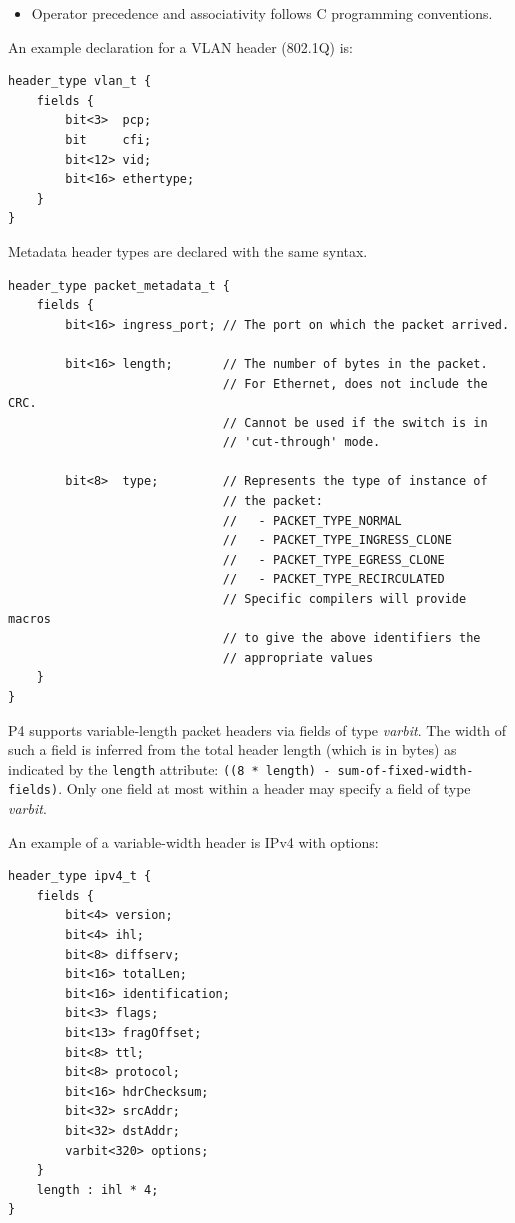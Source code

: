 \documentclass[12pt]{article}
\begin{document}
\begin{itemize}
\item
Operator precedence and associativity follows C programming conventions.
\end{itemize}

An example declaration for a VLAN header (802.1Q) is:

\begin{lstlisting}[style=P4style]
header_type vlan_t {
    fields {
        bit<3>  pcp;
        bit     cfi;
        bit<12> vid;
        bit<16> ethertype;
    }
}
\end{lstlisting}

Metadata header types are declared with the same syntax.

\begin{lstlisting}[style=P4style]
header_type packet_metadata_t {
    fields {
        bit<16> ingress_port; // The port on which the packet arrived.

        bit<16> length;       // The number of bytes in the packet. 
                              // For Ethernet, does not include the CRC. 
                              // Cannot be used if the switch is in
                              // 'cut-through' mode.

        bit<8>  type;         // Represents the type of instance of
                              // the packet: 
                              //   - PACKET_TYPE_NORMAL
                              //   - PACKET_TYPE_INGRESS_CLONE
                              //   - PACKET_TYPE_EGRESS_CLONE
                              //   - PACKET_TYPE_RECIRCULATED
                              // Specific compilers will provide macros
                              // to give the above identifiers the
                              // appropriate values
    }
}
\end{lstlisting}

P4 supports variable-length packet headers via fields of type \textit{varbit}.
The width of such a field is inferred from the total header length (which
is in bytes) as indicated by the \texttt{length} attribute: \texttt{((8 *
length) - sum-of-fixed-width-fields)}. Only one field at most within a header
may specify a field of type \textit{varbit}.

An example of a variable-width header is IPv4 with options:

\begin{lstlisting}[style=P4style]
header_type ipv4_t {
    fields {
        bit<4> version;
        bit<4> ihl;
        bit<8> diffserv;
        bit<16> totalLen;
        bit<16> identification;
        bit<3> flags;
        bit<13> fragOffset;
        bit<8> ttl;
        bit<8> protocol;
        bit<16> hdrChecksum;
        bit<32> srcAddr;
        bit<32> dstAddr;
        varbit<320> options;
    }
    length : ihl * 4;
}
\end{lstlisting}
\end{document}
